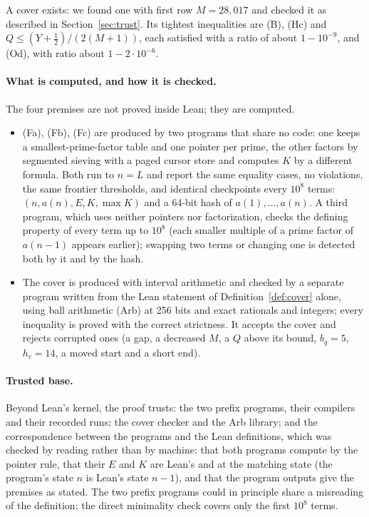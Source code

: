 
A cover exists: we found one with first row $M=28{,}017$ and checked it as
described in Section~\ref{sec:trust}. Its tightest inequalities are (B),
(Hc) and $Q\le(Y+\frac12)/(2(M+1))$, each satisfied with a ratio of about
$1-10^{-9}$, and (Od), with ratio about $1-2\cdot10^{-6}$.

\paragraph{What is computed, and how it is checked.}
The four premises are not proved inside Lean; they are computed.
\begin{itemize}
\item (Fa), (Fb), (Fc) are produced by two programs that share no code:
  one keeps a smallest-prime-factor table and one pointer per prime, the
  other factors by segmented sieving with a paged cursor store and
  computes $K$ by a different formula. Both run to $n=L$ and report the
  same equality cases, no violations, the same frontier thresholds, and
  identical checkpoints every $10^8$ terms: $(n,a(n),E,K,\max K)$ and a
  64-bit hash of $a(1),\dots,a(n)$. A third program, which uses neither
  pointers nor factorization, checks the defining property of every term
  up to $10^8$ (each smaller multiple of a prime factor of $a(n-1)$ appears
  earlier); swapping two terms or changing one is detected both by it and
  by the hash.
\item The cover is produced with interval arithmetic and checked by a
  separate program written from the Lean statement of
  Definition~\ref{def:cover} alone, using ball arithmetic (Arb) at 256
  bits and exact rationals and integers; every inequality is proved with
  the correct strictness. It accepts the cover and rejects corrupted ones
  (a gap, a decreased $M$, a $Q$ above its bound, $b_q=5$, $h_c=14$, a
  moved start and a short end).
\end{itemize}

\paragraph{Trusted base.}
Beyond Lean's kernel, the proof trusts: the two prefix programs, their
compilers and their recorded runs; the cover checker and the Arb library;
and the correspondence between the programs and the Lean definitions,
which was checked by reading rather than by machine: that both programs
compute  by the pointer rule, that their $E$ and $K$ are
Lean's  and  at the matching state
(the program's state $n$ is Lean's state $n-1$), and that the program
outputs give the premises as stated. The two prefix programs could in
principle share a misreading of the definition; the direct minimality
check covers only the first $10^8$ terms.

